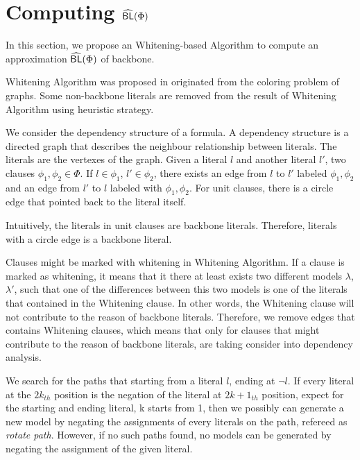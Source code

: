 

\section{Computing ${\sf \widehat{BL}}(\Phi)$}
In this section, we propose an Whitening-based Algorithm to compute an approximation ${\sf \widehat{BL}}(\Phi)$ of backbone.

 Whitening Algorithm was proposed in \cite{CJG2001} originated from the coloring problem of graphs. Some non-backbone literals are removed from the result of Whitening Algorithm using heuristic strategy.

 We consider the dependency structure of a formula. A dependency structure is a directed graph that describes the neighbour relationship between literals. The literals are the vertexes of the graph. Given a literal $l$ and another literal $l'$, two clauses $\phi_1,\phi_2\in\Phi$. If $l\in\phi_1$, $l'\in\phi_2$, there exists an edge from $l$ to $l'$ labeled $\phi_1,\phi_2$ and an edge from $l'$ to $l$ labeled with $\phi_1, \phi_2$. For unit clauses, there is a circle edge that pointed back to the literal itself.

 Intuitively, the literals in unit clauses are backbone literals. Therefore, literals with a circle edge is a backbone literal.

 Clauses might be marked with whitening in Whitening Algorithm. If a clause is marked as whitening, it means that it there at least exists two different models $\lambda$, $\lambda'$, such that one of the differences between this two models is one of the literals that contained in the Whitening clause. In other words, the Whitening clause will not contribute to the reason of backbone literals. Therefore, we remove edges that contains Whitening clauses, which means that only for clauses that might contribute to the reason of backbone literals, are taking consider into dependency analysis.

 We search for the paths that starting from a literal $l$, ending at $\neg l$. If every literal at the $2k_{th}$ position is the negation of the literal at $2k+1_{th}$ position, expect for the starting and ending literal, k starts from 1, then we possibly can generate a new model by negating the assignments of every literals on the path, refereed as \emph{rotate path}. However, if no such paths found, no models can be generated by negating the assignment of the given literal.

